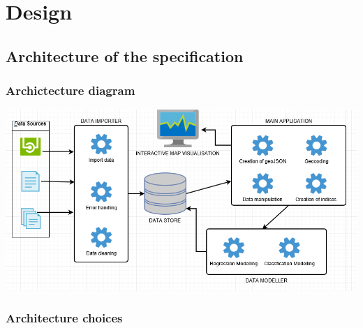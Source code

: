 
\chapter{Design} %

\label{Chapter4} %


\section{Architecture of the specification}

\subsection{Archictecture diagram}

\includegraphics[scale=0.75]{figures/Software_Architecture} %



\subsection{Architecture choices}

